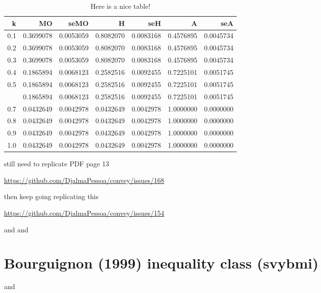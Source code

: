 \documentclass[]{book}
\begin{document}
\begin{table}

\caption{\label{tab:unnamed-chunk-19}Here is a nice table!}
\centering
\begin{tabular}[t]{rrrrrrr}
\toprule
k & MO & seMO & H & seH & A & seA\\
\midrule
0.1 & 0.3699078 & 0.0053059 & 0.8082070 & 0.0083168 & 0.4576895 & 0.0045734\\
0.2 & 0.3699078 & 0.0053059 & 0.8082070 & 0.0083168 & 0.4576895 & 0.0045734\\
0.3 & 0.3699078 & 0.0053059 & 0.8082070 & 0.0083168 & 0.4576895 & 0.0045734\\
0.4 & 0.1865894 & 0.0068123 & 0.2582516 & 0.0092455 & 0.7225101 & 0.0051745\\
0.5 & 0.1865894 & 0.0068123 & 0.2582516 & 0.0092455 & 0.7225101 & 0.0051745\\
\addlinespace
0.6 & 0.1865894 & 0.0068123 & 0.2582516 & 0.0092455 & 0.7225101 & 0.0051745\\
0.7 & 0.0432649 & 0.0042978 & 0.0432649 & 0.0042978 & 1.0000000 & 0.0000000\\
0.8 & 0.0432649 & 0.0042978 & 0.0432649 & 0.0042978 & 1.0000000 & 0.0000000\\
0.9 & 0.0432649 & 0.0042978 & 0.0432649 & 0.0042978 & 1.0000000 & 0.0000000\\
1.0 & 0.0432649 & 0.0042978 & 0.0432649 & 0.0042978 & 1.0000000 & 0.0000000\\
\bottomrule
\end{tabular}
\end{table}

still need to replicate PDF page 13

\url{https://github.com/DjalmaPessoa/convey/issues/168}

then keep going replicating this

\url{https://github.com/DjalmaPessoa/convey/issues/154}

\citep{alkire2011} and \citep{alkire2015} and \citep{pacifico2016}

\section{Bourguignon (1999) inequality class
(svybmi)}\label{bourguignon-1999-inequality-class-svybmi}

\citep{bourguignon1999} and \citep{lugo2007}


\end{document}

